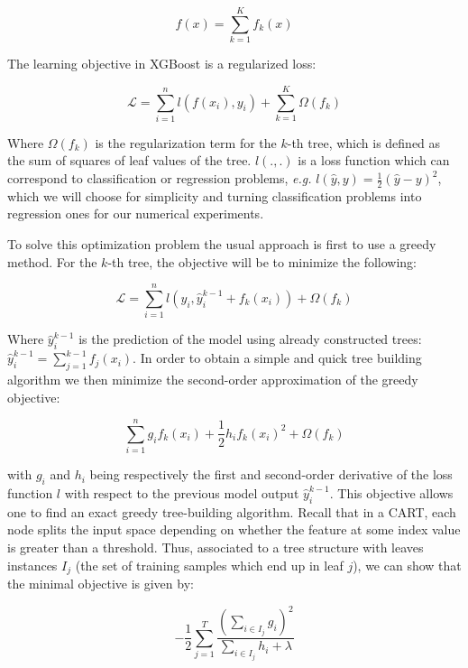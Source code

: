 \documentclass{article}
\theoremstyle{definition}
\begin{document}
\begin{equation*} 
f(x) = \sum_{k = 1}^{K} f_k(x) 
\end{equation*}

The learning objective in XGBoost is a regularized loss:

\begin{equation} 
\mathcal{L} = \sum_{i=1}^n l( f(x_i), y_i) +  \sum_{k=1}^{K} \Omega(f_k) 
\end{equation} 

Where $\Omega(f_k)$ is the regularization term for the $k$-th tree, which is defined as the sum of squares of leaf values of the tree. $l(.,.)$ is a loss function which can correspond to classification or regression problems, \textsl{e.g.} $l(
\hat{y}, y) = \frac 12 (\hat{y} - y)^2$, which we will choose for simplicity and turning classification problems into regression ones for our numerical experiments. \smallskip 

To solve this optimization problem the usual approach is first to use a greedy method. For the $k$-th tree, the objective will be to minimize the following:

\begin{equation*}
\mathcal{L} = \sum_{i=1}^n l(y_i, \hat{y}_i^{k-1} + f_k(x_i)) +   \Omega(f_k) 
\end{equation*}

Where $\hat{y}_i^{k-1}$ is the prediction of the model using already constructed trees: $\hat{y}_i^{k-1} = \sum_{j=1}^{k-1} f_j(x_i)$. In order to obtain a simple and quick tree building algorithm we then minimize the second-order approximation of the greedy objective:

\begin{equation} 
\sum_{i=1}^n  g_i f_k(x_i) + \frac 12 h_i f_k(x_i)^2 + \Omega(f_k) 
\end{equation} 

with $g_i$ and $h_i$ being respectively the first and second-order derivative of the loss function $l$ with respect to the previous model output $\hat{y}_i^{k-1}$. This objective allows one to find an exact greedy tree-building algorithm. Recall that in a CART, each node splits the input space depending on whether the feature at some index value is greater than a threshold. Thus, associated to a tree structure with leaves instances $I_j$ (the set of training samples which end up in leaf $j$), we can show that the minimal objective is given by: 

\begin{equation} 
- \frac 12 \sum_{j=1}^{T} \frac{\left( \sum_{i \in I_j} g_i \right)^2}{\sum_{i \in I_j} h_i + \lambda}  
\label{objective}
\end{equation} 
\end{document}
